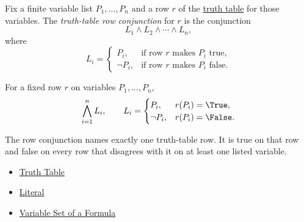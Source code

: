\begin{tcolorbox}[colback=propbox, colframe=propborder, arc=2pt, left=6pt, right=6pt, top=4pt, bottom=4pt, title={\small\textbf{Definition (Truth-Table Row Conjunction)}}]
\begin{definition}
\label{def:truth-table-row-conjunction-propositional-logic}
Fix a finite variable list \(P_1,\ldots,P_n\) and a row \(r\) of the
\hyperref[def:truth-table-propositional-logic]{truth table} for those
variables. The \emph{truth-table row conjunction} for \(r\) is the conjunction
\[
L_1\land L_2\land\cdots\land L_n,
\]
where
\[
L_i=
\begin{cases}
P_i, & \text{if row }r\text{ makes }P_i\text{ true},\\
\neg P_i, & \text{if row }r\text{ makes }P_i\text{ false}.
\end{cases}
\]
\end{definition}
\end{tcolorbox}

\begin{remark*}
For a fixed row \(r\) on variables \(P_1,\ldots,P_n\),
\[
\bigwedge_{i=1}^{n} L_i,
\qquad
L_i=
\begin{cases}
P_i, & r(P_i)=\True,\\
\neg P_i, & r(P_i)=\False.
\end{cases}
\]
\end{remark*}

\begin{remark*}[Interpretation]
The row conjunction names exactly one truth-table row. It is true on that row
and false on every row that disagrees with it on at least one listed variable.
\end{remark*}

\begin{dependencies}
\begin{itemize}
  \item \hyperref[def:truth-table-propositional-logic]{Truth Table}
  \item \hyperref[def:literal-propositional-logic]{Literal}
  \item \hyperref[def:formula-variable-set-propositional-logic]{Variable Set of a Formula}
\end{itemize}
\end{dependencies}

